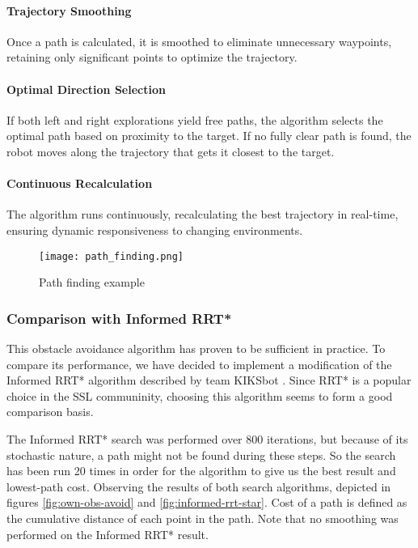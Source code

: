\paragraph{Trajectory Smoothing}

Once a path is calculated, it is smoothed to eliminate unnecessary waypoints, retaining only significant points to optimize the trajectory.

\paragraph{Optimal Direction Selection}

If both left and right explorations yield free paths, the algorithm selects the optimal path based on proximity to the target. If no fully clear path is found, the robot moves along the trajectory that gets it closest to the target.

\paragraph{Continuous Recalculation}

The algorithm runs continuously, recalculating the best trajectory in real-time, ensuring dynamic responsiveness to changing environments.

\begin{figure}
    \centering
    \texttt{[image: path\_finding.png]}
    \caption{Path finding example}
    \label{fig:path_finding}
\end{figure}

\subsubsection{Comparison with Informed RRT*}
This obstacle avoidance algorithm has proven to be sufficient in practice. To compare its performance, we have decided to implement
a modification of the Informed RRT* algorithm described by team KIKSbot \cite{tdp_kiksbot_2023}. Since RRT* is a popular choice in the SSL communinity,
choosing this algorithm seems to form a good comparison basis.

The Informed RRT* search was performed over 800 iterations, but because of its stochastic nature, a path might not be found
during these steps. So the search has been run 20 times in order for the algorithm to give us the best result and lowest-path cost.
Observing the results of both search algorithms, depicted in figures \ref{fig:own-obs-avoid} and \ref{fig:informed-rrt-star}.
Cost of a path is defined as the cumulative distance of each point in the path. Note that no smoothing was performed on the Informed RRT* result.

